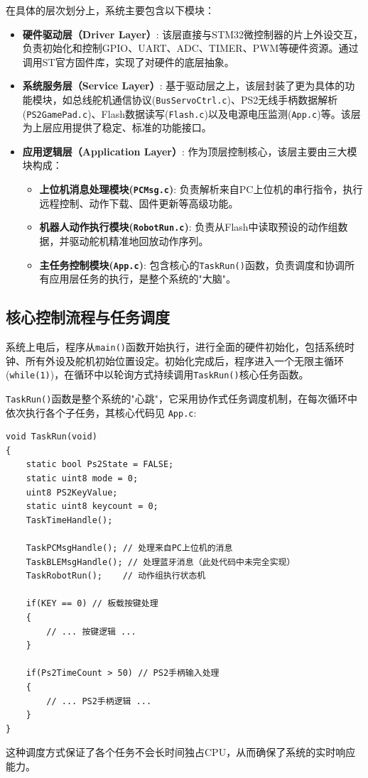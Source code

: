 \documentclass[a4paper,fontset=windows]{ctexart}
\providecommand{\tightlist}{%
  \setlength{\itemsep}{0pt}\setlength{\parskip}{0pt}}
\begin{document}
在具体的层次划分上，系统主要包含以下模块：
\begin{itemize}
    \tightlist
    \item \textbf{硬件驱动层（Driver Layer）}: 该层直接与STM32微控制器的片上外设交互，负责初始化和控制GPIO、UART、ADC、TIMER、PWM等硬件资源。通过调用ST官方固件库，实现了对硬件的底层抽象。
    \item \textbf{系统服务层（Service Layer）}: 基于驱动层之上，该层封装了更为具体的功能模块，如总线舵机通信协议(\texttt{BusServoCtrl.c})、PS2无线手柄数据解析(\texttt{PS2GamePad.c})、Flash数据读写(\texttt{Flash.c})以及电源电压监测(\texttt{App.c})等。该层为上层应用提供了稳定、标准的功能接口。
    \item \textbf{应用逻辑层（Application Layer）}: 作为顶层控制核心，该层主要由三大模块构成：
    \begin{itemize}
        \tightlist
        \item \textbf{上位机消息处理模块(\texttt{PCMsg.c})}: 负责解析来自PC上位机的串行指令，执行远程控制、动作下载、固件更新等高级功能。
        \item \textbf{机器人动作执行模块(\texttt{RobotRun.c})}: 负责从Flash中读取预设的动作组数据，并驱动舵机精准地回放动作序列。
        \item \textbf{主任务控制模块(\texttt{App.c})}: 包含核心的\texttt{TaskRun()}函数，负责调度和协调所有应用层任务的执行，是整个系统的"大脑"。
    \end{itemize}
\end{itemize}

\subsection{核心控制流程与任务调度}
系统上电后，程序从\texttt{main()}函数开始执行，进行全面的硬件初始化，包括系统时钟、所有外设及舵机初始位置设定。初始化完成后，程序进入一个无限主循环(\texttt{while(1)})，在循环中以轮询方式持续调用\texttt{TaskRun()}核心任务函数。

\texttt{TaskRun()}函数是整个系统的"心跳"，它采用协作式任务调度机制，在每次循环中依次执行各个子任务，其核心代码见 \texttt{App.c}:
\begin{verbatim}
void TaskRun(void)
{
	static bool Ps2State = FALSE;
	static uint8 mode = 0;
	uint8 PS2KeyValue;
	static uint8 keycount = 0;
	TaskTimeHandle();
	
	TaskPCMsgHandle(); // 处理来自PC上位机的消息
	TaskBLEMsgHandle(); // 处理蓝牙消息（此处代码中未完全实现）
	TaskRobotRun();    // 动作组执行状态机

	if(KEY == 0) // 板载按键处理
	{
		// ... 按键逻辑 ...
	}
	
	if(Ps2TimeCount > 50) // PS2手柄输入处理
	{
		// ... PS2手柄逻辑 ...
	}
}
\end{verbatim}
这种调度方式保证了各个任务不会长时间独占CPU，从而确保了系统的实时响应能力。
\end{document}
